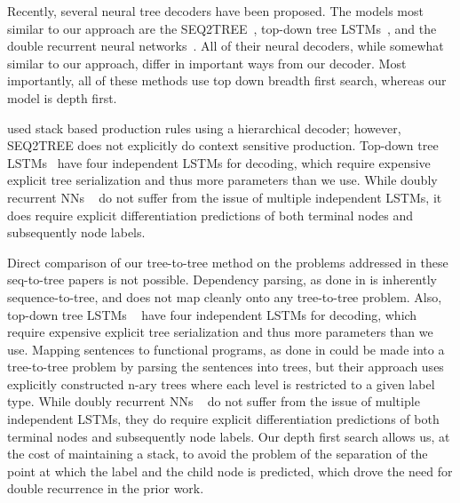 \documentclass{article}
\begin{document}
Recently, several neural tree decoders have been proposed. The models most similar to our approach are the SEQ2TREE~\citep{Dong2016-qq}, top-down tree LSTMs~\citep{Zhang2015-bg}, and the double recurrent neural networks~\citep{alvarez2017tree}. All of their neural decoders, while somewhat similar to our approach, differ in important ways from our decoder. Most importantly, all of these methods use top down breadth first search, whereas our model is depth first.

\citet{Dong2016-qq} used stack based production rules using a hierarchical decoder; however, SEQ2TREE does not explicitly do context sensitive production. Top-down tree LSTMs~\citep{Zhang2015-bg} have four independent LSTMs for decoding, which require expensive explicit tree serialization and thus more parameters than we use. While doubly recurrent NNs ~\citep{alvarez2017tree} do not suffer from the issue of multiple independent LSTMs, it does require explicit differentiation predictions of both terminal nodes and subsequently node labels.




Direct comparison of our tree-to-tree method on the problems addressed in these seq-to-tree papers is not possible. Dependency parsing, as done in \citep{Zhang2015-bg} is inherently sequence-to-tree, and does not map cleanly onto any tree-to-tree problem. Also, top-down tree LSTMs ~\citep{Zhang2015-bg} have four independent LSTMs for decoding, which require expensive explicit tree serialization and thus more parameters than we use.
Mapping sentences to functional programs, as done in \citep{alvarez2017tree,Dong2016-qq} could be made into a tree-to-tree problem by parsing the sentences into trees, but their approach uses explicitly constructed n-ary trees where each level is restricted to a given label type.
While doubly recurrent NNs ~\citep{alvarez2017tree} do not suffer from the issue of multiple independent LSTMs, they do require explicit differentiation predictions of both terminal nodes and subsequently node labels.
Our depth first search allows us, at the cost of maintaining a stack, to avoid the problem of the separation of the point at which the label and the child node is predicted, which drove the need for double recurrence in the prior work. 
\end{document}
